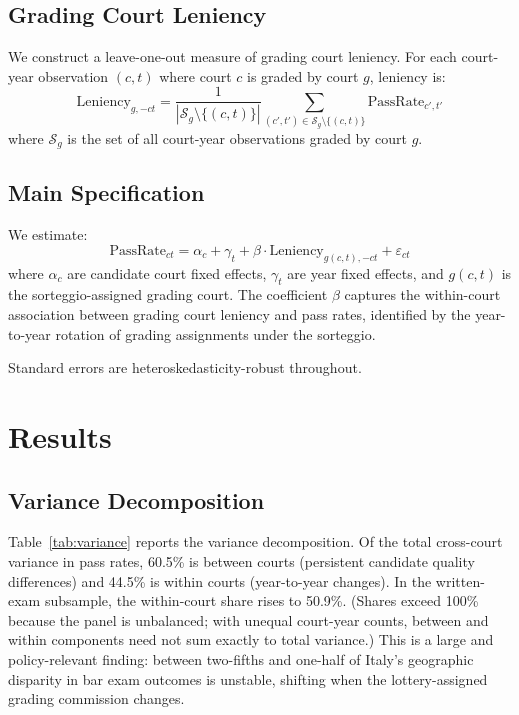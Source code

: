 \documentclass[11pt]{article}
\begin{document}
\subsection{Grading Court Leniency}

We construct a leave-one-out measure of grading court leniency. For each court-year observation $(c, t)$ where court $c$ is graded by court $g$, leniency is:
\begin{equation}
\text{Leniency}_{g,-ct} = \frac{1}{|\mathcal{S}_{g} \setminus \{(c,t)\}|} \sum_{(c',t') \in \mathcal{S}_g \setminus \{(c,t)\}} \text{PassRate}_{c',t'}
\end{equation}
where $\mathcal{S}_g$ is the set of all court-year observations graded by court $g$.

\subsection{Main Specification}

We estimate:
\begin{equation}
\text{PassRate}_{ct} = \alpha_c + \gamma_t + \beta \cdot \text{Leniency}_{g(c,t),-ct} + \varepsilon_{ct}
\end{equation}
where $\alpha_c$ are candidate court fixed effects, $\gamma_t$ are year fixed effects, and $g(c,t)$ is the sorteggio-assigned grading court. The coefficient $\beta$ captures the within-court association between grading court leniency and pass rates, identified by the year-to-year rotation of grading assignments under the sorteggio.

Standard errors are heteroskedasticity-robust throughout.

\section{Results} \label{sec:results}

\subsection{Variance Decomposition}

Table~\ref{tab:variance} reports the variance decomposition. Of the total cross-court variance in pass rates, 60.5\% is between courts (persistent candidate quality differences) and 44.5\% is within courts (year-to-year changes). In the written-exam subsample, the within-court share rises to 50.9\%. (Shares exceed 100\% because the panel is unbalanced; with unequal court-year counts, between and within components need not sum exactly to total variance.) This is a large and policy-relevant finding: between two-fifths and one-half of Italy's geographic disparity in bar exam outcomes is unstable, shifting when the lottery-assigned grading commission changes.
\end{document}
